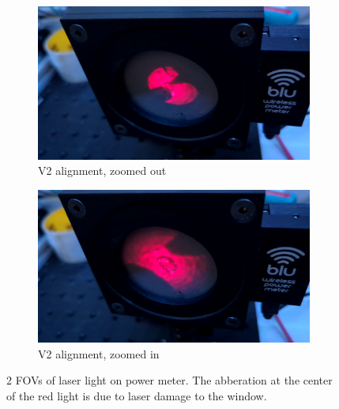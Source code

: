             \begin{figure}[!ht]
                \centering
                \begin{subfigure}[t]{0.45\textwidth}
                    \centering
                    \includegraphics[width=\textwidth]{assets/4 experiments/V2 alignment 1.png}
                    \caption{V2 alignment, zoomed out}
                \end{subfigure}
                \hfill
                \begin{subfigure}[t]{0.45\textwidth}
                    \centering
                    \includegraphics[width=\textwidth]{assets/4 experiments/V2 alignment 2.png}
                    \caption{V2 alignment, zoomed in}
                \end{subfigure}
                \caption{2 FOVs of laser light on power meter. The abberation at the center of the red light is due to laser damage to the window.}
                \label{fig:FOV}
            \end{figure}



